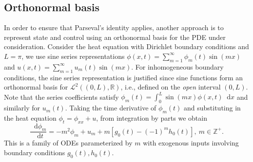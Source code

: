 \documentclass[journal,twoside,web]{ieeecolor}
\newcommand{\ZZ}{\mathbb{Z}}
\newcommand{\RR}{\mathbb{R}}
\newcommand{\state}{\phi}
\newcommand*\diff{\mathop{}\!\mathrm{d}}
\begin{document}
\subsection{Orthonormal basis}
\label{sec:separation-variables}
In order to ensure that Parseval's identity applies, another approach is to represent state and control using an orthonormal basis for the PDE under consideration.
Consider the heat equation with Dirichlet boundary conditions and $L=\pi$, we use sine series representations $\state(x,t)=\sum_{m=1}^{\infty} \state_m(t)\sin(m x)$ and $u(x,t)=\sum_{m=1}^{\infty} u_m(t)\sin(m x)$.
For inhomogeneous boundary conditions, the sine series representation is justified since sine functions form an orthonormal basis for $\mathcal{L}^2((0,L),\RR)$, i.e., defined on the \emph{open} interval $(0,L)$.
Note that the series coefficients satisfy $\state_m(t)=\int_{0}^{L}\sin(m x)\state(x,t)\diff x$ and similarly for $u_m(t)$. Taking the time derivative of $\state_m(t)$ and substituting in the heat equation $\state_t = \state_{xx}+u$, from integration by parts we obtain
\begin{equation}\label{eq:ode-separation-m}
	\frac{\diff\state_m}{\diff t} =- m^2\state_m + u_m + m\left[g_0(t) - (-1)^mh_0(t)\right],\ m\in\ZZ^+.
\end{equation}
This is a family of ODEs parameterized by $m$ with exogenous inputs involving boundary conditions $g_0(t),h_0(t)$. 
\end{document}
